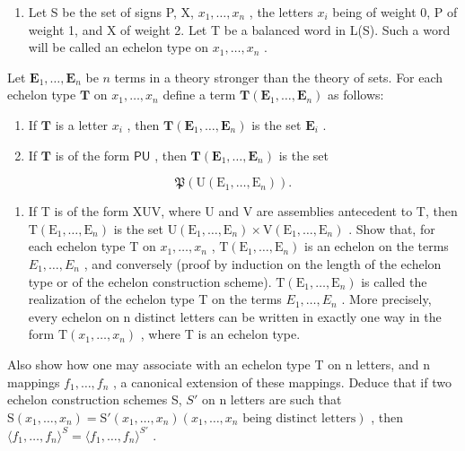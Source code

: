 \exercisegroup

\begin{enumerate}
\def\labelenumi{\arabic{enumi}.}
\tightlist
\item
  Let S be the set of signs P, X, \(x_{1}, \ldots, x_{n}\) , the letters \(x_{i}\) being of weight 0, P of weight 1, and X of weight 2. Let T be a balanced word in L(S). Such a word will be called an echelon type on \(x_{1}, \ldots, x_{n}\) .
\end{enumerate}

Let \(\mathbf{E}_1, \ldots, \mathbf{E}_n\) be \(n\) terms in a theory stronger than the theory of sets. For each echelon type \(\mathbf{T}\) on \(x_1, \ldots, x_n\) define a term \(\mathbf{T}(\mathbf{E}_1, \ldots, \mathbf{E}_n)\) as follows:

\begin{enumerate}
\def\labelenumi{(\roman{enumi})}
\item
  If \(\mathbf{T}\) is a letter \(x_{i}\) , then \(\mathbf{T}(\mathbf{E}_{1},\ldots,\mathbf{E}_{n})\) is the set \(\mathbf{E}_i\) .
\item
  If \(\mathbf{T}\) is of the form \(\mathsf{PU}\) , then \(\mathbf{T}(\mathbf{E}_1, \ldots, \mathbf{E}_n)\) is the set
\end{enumerate}

\[
\mathfrak {P} (\mathrm{U} (\mathrm{E} _ {1}, \dots , \mathrm{E} _ {n})).
\]

\begin{enumerate}
\def\labelenumi{(\roman{enumi})}
\setcounter{enumi}{2}
\tightlist
\item
  If T is of the form XUV, where U and V are assemblies antecedent to T, then \(\mathrm{T}(\mathrm{E}_{1},\ldots,\mathrm{E}_{n})\) is the set \(\mathrm{U}(\mathrm{E}_{1},\ldots,\mathrm{E}_{n})\times\mathrm{V}(\mathrm{E}_{1},\ldots,\mathrm{E}_{n})\) . Show that, for each echelon type T on \(x_{1},\ldots,x_{n}\) , \(\mathrm{T}(\mathrm{E}_{1},\ldots,\mathrm{E}_{n})\) is an echelon on the terms \(E_{1},\ldots,E_{n}\) , and conversely (proof by induction on the length of the echelon type or of the echelon construction scheme). \(\mathrm{T}(\mathrm{E}_{1},\ldots,\mathrm{E}_{n})\) is called the realization of the echelon type T on the terms \(E_{1},\ldots,E_{n}\) . More precisely, every echelon on n distinct letters can be written in exactly one way in the form \(\mathrm{T}(x_{1},\ldots,x_{n})\) , where T is an echelon type.
\end{enumerate}

Also show how one may associate with an echelon type T on n letters, and n mappings \(f_{1}, \ldots, f_{n}\) , a canonical extension of these mappings. Deduce that if two echelon construction schemes S, \(S'\) on n letters are such that \(\mathrm{S}(x_{1}, \ldots, x_{n}) = \mathrm{S}'(x_{1}, \ldots, x_{n}) (x_{1}, \ldots, x_{n} \text{ being distinct letters})\) , then \(\langle f_{1}, \ldots, f_{n} \rangle^{S} = \langle f_{1}, \ldots, f_{n} \rangle^{S'}\) .

